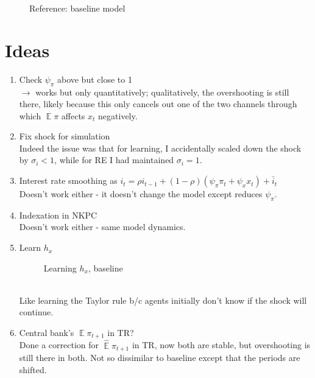 \documentclass[11pt]{article}
\def \myFigPath {../figures/}
\renewcommand{\[}{\begin{equation}}
\renewcommand{\]}{\end{equation}}
\DeclareMathOperator{\E}{\mathbb{E}}
\def\myAdjustableFigScale{0.14}
\begin{document}
\newpage
\begin{figure}[h!]
\caption{Reference: baseline model}
\end{figure}


\section{Ideas}
\begin{enumerate}
\item Check $\psi_{\pi}$ above but close to 1 \\
$\rightarrow$ works but only quantitatively; qualitatively, the overshooting is still there, likely because this only cancels out one of the two channels through which $\E{\pi}$ affects $x_t$ negatively.
\item Fix shock for simulation \\
Indeed the issue was that for learning, I accidentally scaled down the shock by $\sigma_i < 1$, while for RE I had maintained $\sigma_i = 1$.
\item Interest rate smoothing as  $i_t = \rho i_{t-1} + (1-\rho)(\psi_{\pi}\pi_t + \psi_x x_t) + \bar{i}_t$ \\
Doesn't work either - it doesn't change the model except reduces $\psi_{\pi}$.
\item Indexation in NKPC \\
Doesn't work either - same model dynamics.

\item Learn $h_x$
\begin{figure}[h!]
\caption{Learning $h_x$, baseline}
\end{figure} \\
Like learning the Taylor rule b/c agents initially don't know if the shock will continue.
\item Central bank's $\E\pi_{t+1}$ in TR? \\
Done a correction for $\hat{\E}\pi_{t+1}$ in TR, now both are stable, but overshooting is still there in both. Not so dissimilar to baseline except that the periods are shifted.


\end{enumerate}
\end{document}
